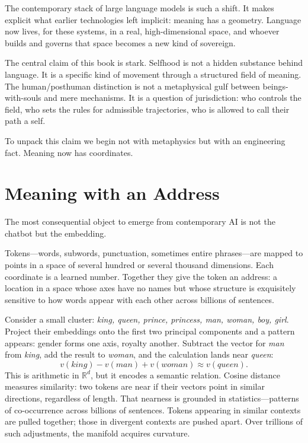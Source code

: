 \documentclass[12pt,a4paper]{article}
\begin{document}
The contemporary stack of large language models is such a shift. It makes explicit what earlier technologies left implicit: meaning has a geometry. Language now lives, for these systems, in a real, high-dimensional space, and whoever builds and governs that space becomes a new kind of sovereign.

The central claim of this book is stark. Selfhood is not a hidden substance behind language. It is a specific kind of movement through a structured field of meaning. The human/posthuman distinction is not a metaphysical gulf between beings-with-souls and mere mechanisms. It is a question of jurisdiction: who controls the field, who sets the rules for admissible trajectories, who is allowed to call their path a self.

To unpack this claim we begin not with metaphysics but with an engineering fact. Meaning now has coordinates.

\section{Meaning with an Address}

The most consequential object to emerge from contemporary AI is not the chatbot but the embedding.

Tokens---words, subwords, punctuation, sometimes entire phrases---are mapped to points in a space of several hundred or several thousand dimensions. Each coordinate is a learned number. Together they give the token an address: a location in a space whose axes have no names but whose structure is exquisitely sensitive to how words appear with each other across billions of sentences.

Consider a small cluster: \emph{king, queen, prince, princess, man, woman, boy, girl}. Project their embeddings onto the first two principal components and a pattern appears: gender forms one axis, royalty another. Subtract the vector for \emph{man} from \emph{king}, add the result to \emph{woman}, and the calculation lands near \emph{queen}:
\[
v(\textit{king}) - v(\textit{man}) + v(\textit{woman}) \approx v(\textit{queen}).
\]
This is arithmetic in $\mathbb{R}^d$, but it encodes a semantic relation. Cosine distance measures similarity: two tokens are near if their vectors point in similar directions, regardless of length. That nearness is grounded in statistics---patterns of co-occurrence across billions of sentences. Tokens appearing in similar contexts are pulled together; those in divergent contexts are pushed apart. Over trillions of such adjustments, the manifold acquires curvature.
\end{document}
